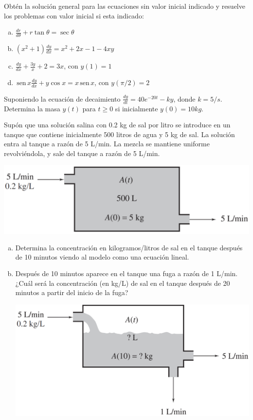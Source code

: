 \documentclass[12pt]{exam}
\renewcommand{\sin}{\,\text{sen}\,}
\begin{document}
\begin{questions}
     \question%
     Obtén la solución general para las ecuaciones sin valor inicial indicado y resuelve los problemas con valor inicial si esta indicado:
     \begin{enumerate}[a)]
     \item	$\frac{dr}{d\theta}+r\tan\theta=\sec\theta$
     \item	$(x^2+1)\frac{dy}{dx}=x^2+2x-1-4xy$
     \item	$\frac{dy}{dx}+\frac{3y}{x}+2=3x$, con $y(1)=1$
     \item	$\sin x\frac{dy}{dx}+y\cos x=x\sin x$, con $y(\pi/2)=2$
     \end{enumerate}

     \question%
     Suponiendo la ecuación de decaimiento $\frac{dy}{dt}=40e^{-20t}-ky$, donde $k=5/s$. Determina la masa $y(t)$ para $t\geq0$ si inicialmente $y(0)=10kg$.

     \question%
     Supón que una solución salina con 0.2 kg de sal por litro se introduce en un tanque que contiene inicialmente 500 litros de agua y 5 kg de sal. La solución entra al tanque a razón de 5 L/min. La mezcla se mantiene uniforme revolviéndola, y sale del tanque a razón de 5 L/min.

\includegraphics[scale=.34]{F2T2.pdf}

\begin{enumerate}[a)]
	\item	Determina la concentración en kilogramos/litros de sal en el tanque después de 10 minutos viendo al modelo como una ecuación lineal.
    \item Después de 10 minutos aparece en el tanque una fuga a razón de 1 L/min. ¿Cuál será la concentración (en kg/L) de sal en el tanque después de 20 minutos a partir del inicio de la fuga?
    
    \includegraphics[scale=.34]{F3T2.pdf}
    

\end{enumerate}
\end{questions}
\end{document}
